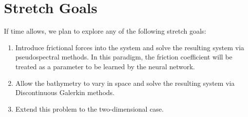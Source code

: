 \documentclass[letterpaper,11pt]{article}
\begin{document}
    

    
    \section{Stretch Goals}\label{sec:stretch-goals}

    If time allows, we plan to explore any of the following stretch goals:

    \begin{enumerate}
        \item Introduce frictional forces into the system and solve the resulting system via pseudospectral methods. In
              this paradigm, the friction coefficient will be treated as a parameter to be learned by the neural 
              network.
        \item Allow the bathymetry to vary in space and solve the resulting system via Discontinuous Galerkin methods.
        \item Extend this problem to the two-dimensional case.
    \end{enumerate}


    \pagebreak

    
    

    \pagebreak
    \appendix
    
\end{document}
